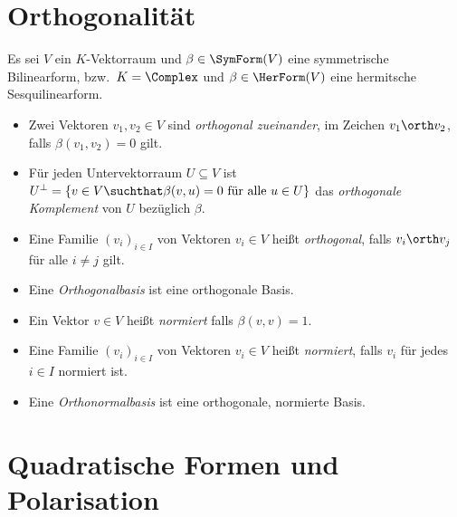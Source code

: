 \section{Orthogonalität}

Es sei $V$ ein $K$-Vektorraum und $\beta \in \SymForm(V)$ eine symmetrische Bilinearform, bzw.\ $K = \Complex$ und $\beta \in \HerForm(V)$ eine hermitsche Sesquilinearform.

\begin{definition}
  \begin{itemize}
    \item
      Zwei Vektoren $v_1, v_2 \in V$ sind \emph{orthogonal zueinander}, im Zeichen $v_1 \orth v_2$, falls $\beta(v_1, v_2) = 0$ gilt.
    \item
      Für jeden Untervektorraum $U \subseteq V$ ist $U^\perp = \{v \in V \suchthat \text{$\beta(v,u) = 0$ für alle $u \in U$}\}$ das \emph{orthogonale Komplement} von $U$ bezüglich $\beta$.
    \item
      Eine Familie $(v_i)_{i \in I}$ von Vektoren $v_i \in V$ heißt \emph{orthogonal}, falls $v_i \orth v_j$ für alle $i \neq j$ gilt.
    \item
      Eine \emph{Orthogonalbasis} ist eine orthogonale Basis.
    \item
      Ein Vektor $v \in V$ heißt \emph{normiert} falls $\beta(v,v) = 1$.
    \item
      Eine Familie $(v_i)_{i \in I}$ von Vektoren $v_i \in V$ heißt \emph{normiert}, falls $v_i$ für jedes $i \in I$ normiert ist.
    \item
      Eine \emph{Orthonormalbasis} ist eine orthogonale, normierte Basis.
  \end{itemize}
\end{definition}





\section{Quadratische Formen und Polarisation}


